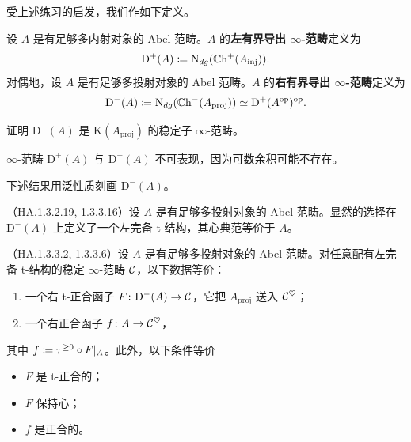 \nitem\label{L17-3.5} 受上述练习的启发，我们作如下定义。

\begin{definition}\label{L17-3.6}
设 $A$ 是有足够多内射对象的 Abel 范畴。$A$ 的\textbf{左有界导出 $\infty$-范畴}定义为
\[
\mathrm{D}^+(A)\coloneqq\mathrm{N}_{dg}(\mathbb{C}\mathrm{h}^+(A_{\mathrm{inj}})).
\]
对偶地，设 $A$ 是有足够多投射对象的 Abel 范畴。$A$ 的\textbf{右有界导出 $\infty$-范畴}定义为
\[
\mathrm{D}^-(A)\coloneqq\mathrm{N}_{dg}(\mathbb{C}\mathrm{h}^-(A_{\mathrm{proj}}))\simeq\mathrm{D}^+(A^{\mathrm{op}})^{\mathrm{op}}.
\]
\end{definition}


\begin{exercise}\label{L17-3.7}
证明 $\mathrm{D}^-(A)$ 是 $\mathrm{K}(A_{\mathrm{proj}})$ 的稳定子 $\infty$-范畴。
\end{exercise}

\begin{warning}\label{L17-3.8}
$\infty$-范畴 $\mathrm{D}^+(A)$ 与 $\mathrm{D}^-(A)$ 不可表现，因为可数余积可能不存在。
\end{warning}

\nitem\label{L17-3.9} 下述结果用泛性质刻画 $\mathrm{D}^-(A)$。

\begin{proposition}\label{L17-3.10}
（HA.1.3.2.19, 1.3.3.16）设 $A$ 是有足够多投射对象的 Abel 范畴。显然的选择在 $\mathrm{D}^-(A)$ 上定义了一个左完备 t-结构，其心典范等价于 $A$。
\end{proposition}

\begin{theorem}\label{L17-3.11}
（HA.1.3.3.2, 1.3.3.6）设 $A$ 是有足够多投射对象的 Abel 范畴。对任意配有左完备 t-结构的稳定 $\infty$-范畴 $\mathcal{C}$，以下数据等价：
\begin{enumerate}[label=(\roman*),leftmargin=2.4em,itemsep=0.1em]
\item 一个右 t-正合函子 $F\colon\mathrm{D}^-(A)\to\mathcal{C}$，它把 $A_{\mathrm{proj}}$ 送入 $\mathcal{C}^{\heartsuit}$；
\item 一个右正合函子 $f\colon A\to\mathcal{C}^{\heartsuit}$，
\end{enumerate}
其中 $f\coloneqq\tau^{\ge0}\circ F|_{A}$。此外，以下条件等价
\begin{itemize}[leftmargin=2.2em,itemsep=0.1em]
\item $F$ 是 t-正合的；
\item $F$ 保持心；
\item $f$ 是正合的。
\end{itemize}
\end{theorem}

